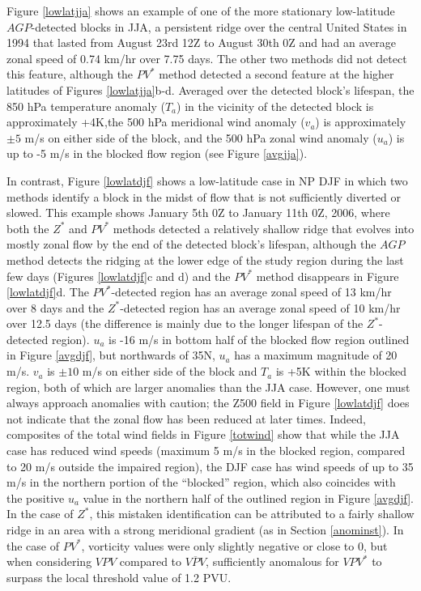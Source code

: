 \documentclass[smallextended]{svjour3}       %
\numberwithin{equation}{section}
\begin{document}
Figure \ref{lowlatjja} shows an example of one of the more stationary low-latitude $AGP$-detected blocks in JJA, a persistent ridge over the central United States in 1994 that lasted from August 23rd 12Z to August 30th 0Z and had an average zonal speed of 0.74 km/hr over 7.75 days. The other two methods did not detect this feature, although the $PV^*$ method detected a second feature at the higher latitudes of Figures \ref{lowlatjja}b-d. Averaged over the detected block's lifespan, the 850 hPa temperature anomaly ($T_a$) in the vicinity of the detected block is approximately +4K,the 500 hPa meridional wind anomaly ($v_a$) is approximately $\pm5$ m/s on either side of the block, and the 500 hPa zonal wind anomaly ($u_a$) is up to -5 m/s in the blocked flow region (see Figure \ref{avgjja}). 

In contrast, Figure \ref{lowlatdjf} shows a low-latitude case in NP DJF in which two methods identify a block in the midst of flow that is not sufficiently diverted or slowed. This example shows January 5th 0Z to January 11th 0Z, 2006, where both the $Z^*$ and $PV^*$ methods detected a relatively shallow ridge that evolves into mostly zonal flow by the end of the detected block's lifespan, although the $AGP$ method detects the ridging at the lower edge of the study region during the last few days (Figures \ref{lowlatdjf}c and d) and the $PV^*$ method disappears in Figure \ref{lowlatdjf}d. The $PV^*$-detected region has an average zonal speed of 13 km/hr over 8 days and the $Z^*$-detected region has an average zonal speed of 10 km/hr over 12.5 days (the difference is mainly due to the longer lifespan of the $Z^*$-detected region). $u_a$ is -16 m/s in bottom half of the blocked flow region outlined in Figure \ref{avgdjf}, but northwards of 35N, $u_a$ has a maximum magnitude of 20 m/s. $v_a$ is $\pm 10$ m/s on either side of the block and $T_a$ is +5K within the blocked region, both of which are larger anomalies than the JJA case. However, one must always approach anomalies with caution; the Z500 field in Figure \ref{lowlatdjf} does not indicate that the zonal flow has been reduced at later times. Indeed, composites of the total wind fields in Figure \ref{totwind} show that while the JJA case has reduced wind speeds (maximum 5 m/s in the blocked region, compared to 20 m/s outside the impaired region), the DJF case has wind speeds of up to 35 m/s in the northern portion of the ``blocked'' region, which also coincides with the positive $u_a$ value in the northern half of the outlined region in Figure \ref{avgdjf}. In the case of $Z^*$, this mistaken identification can be attributed to a fairly shallow ridge in an area with a strong meridional gradient (as in Section \ref{anominst}). In the case of $PV^*$, vorticity values were only slightly negative or close to 0, but when considering $VPV$ compared to $\overline{VPV}$, sufficiently anomalous for $VPV^*$ to surpass the local threshold value of 1.2 PVU.
\end{document}
